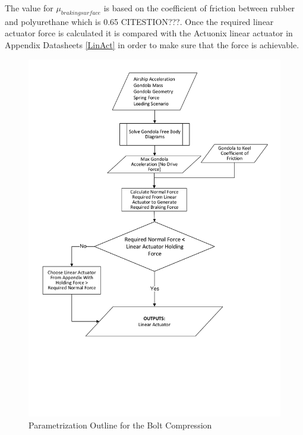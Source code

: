 \documentclass[../main.tex]{subfiles}
\begin{document}
The value for $\mu_{braking surface}$ is based on the coefficient of friction between rubber and polyurethane which is 0.65 CITESTION???. Once the required linear actuator force is calculated it is compared with the Actuonix linear actuator in Appendix Datasheets \ref{LinAct} in order to make sure that the force is achievable.

\begin{figure}[H]
	\centering
	\includegraphics[width=\linewidth]{img/paramaterization/linearActuator.pdf}
	\caption{Parametrization Outline for the Bolt Compression}
	\label{fig:linearActuatorParametrization}
\end{figure}
\end{document}
